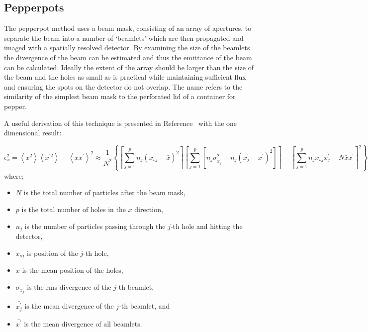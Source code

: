 \subsection{Pepperpots}

The pepperpot method uses a beam mask, consisting of an array of apertures, to separate the beam into a number of `beamlets' which are then propagated and imaged with a spatially resolved detector.
By examining the size of the beamlets the divergence of the beam can be estimated and thus the emittance of the beam can be calculated.
Ideally the extent of the array should be larger than the size of the beam and the holes as small as is practical while maintaining sufficient flux and ensuring the spots on the detector do not overlap.
The name refers to the similarity of the simplest beam mask to the perforated lid of a container for pepper.

A useful derivation of this technique is presented in Reference~\cite{zhang_emittance_1996} with the one dimensional result:

\begin{dmath}\label{equation:pepperpot}
\epsilon_x^2 = \left\langle x^2\right\rangle \left\langle x^{\prime2}\right\rangle - \left\langle xx^\prime\right\rangle^2\allowbreak
\approx \frac{1}{N^2} \left\{\left[\sum_{j=1}^p{n_j\left(x_{sj}-\bar{x}\right)^2}\right] \left[ \sum_{j=1}^p{\left[n_j\sigma_{x_j^\prime}^2 + n_j\left(\bar{x_j^\prime}-\bar{x^\prime}\right)^2\right]}\right] - \left[ \sum_{j=1}^p{n_jx_{sj}\bar{x_j^\prime}-N\bar{x}\bar{x^\prime}}\right]^2\right\}
\end{dmath}
where;
\begin{itemize}
    \item $N$ is the total number of particles after the beam mask,
    \item $p$ is the total number of holes in the $x$ direction,
    \item $n_j$ is the number of particles passing through the $j$-th hole and hitting the detector,
    \item $x_{sj}$ is position of the $j$-th hole,
    \item $\bar{x}$ is the mean position of the holes,
    \item $\sigma_{x_j^\prime}$ is the \gls{rms} divergence of the $j$-th beamlet,
    \item $\bar{x_j^\prime}$ is the mean divergence of the $j$-th beamlet, and
    \item $\bar{x^\prime}$ is the mean divergence of all beamlets.
\end{itemize}

